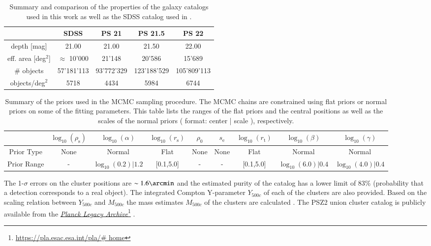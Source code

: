 \documentclass[iop, apjl, twocolappendix, numberedappendix]{emulateapj}
\newcommand\fnurl[2]{%
  \href{#2}{#1}\footnote{\url{#2}}%
}
\begin{document}
\begin{table}
    \centering
    \caption{Summary and comparison of the properties of the galaxy catalogs used in this work as well as the SDSS catalog used in \citet{more2016detection}.}
    \label{tab:galaxy_catalogs}
    \begin{tabular}{ccccc}
    \hline 
    & SDSS & PS 21 & PS 21.5 & PS 22 \\ 
    \hline 
    depth [mag] & 21.00 & 21.00 & 21.50 & 22.00\\ 
    \hline 
    eff. area [deg$^2$] & $\approx$ 10'000 & 21'148 & 20'586 & 15'689\\ 
    \hline 
    \# objects & 57'181'113 & 93'772'329 & 123'188'529 & 105'809'113 \\
    \hline
    objects/deg$^2$ & 5718 & 4434 & 5984 & 6744\\ 
    \hline
    \end{tabular} 
\end{table}
\begin{table}
    \centering
    \caption{Summary of the priors used in the MCMC sampling
procedure. The MCMC chains are constrained using flat priors or
normal priors on some of the fitting parameters. This table lists
the ranges of the flat priors and the central positions as well as
the scales of the normal priors ( format: center | scale ),
respectively.}
    \label{tab:priors}
    \begin{tabular}{ccccccccc}
    \hline 
    & $\log_{10}(\rho_{\mathrm{s}})$ & $\log_{10}(\alpha)$ & $\log_{10}(r_{\mathrm{s}})$ & $\rho_0$ & $s_{\mathrm{e}}$ & $\log_{10}(r_{\mathrm{t}})$ & $\log_{10}(\beta)$ & $\log_{10}(\gamma)$ \\ 
    \hline 
    Prior Type & None & Normal & Flat & None & None & Flat & Normal & Normal\\ 
    \hline 
    Prior Range & - & $\log_{10}(0.2)| 1.2$ & [0.1,5.0] & - & - & [0.1,5.0] & $\log_{10}(6.0) | 0.4$ & $\log_{10}(4.0) | 0.4$\\
    \hline
    \end{tabular} 
\end{table}

The 1-$\sigma$ errors on the cluster positions are $\sim1.6\arcmin$
and the estimated purity of the catalog has a lower limit of 83\%
(probability that a detection corresponds to a real object). The
integrated Compton Y-parameter $Y_{500c}$ of each of the clusters
are also provided. Based on the scaling relation between $Y_{500c}$
and $M_{500c}$ \citep{ade2014planck} the mass estimates $M_{500c}$
of the clusters are calculated
\citep{adam2016planck,collaboration2016planck}. The PSZ2 union
cluster catalog is publicly available from the \fnurl{\textit{Planck
Legacy Archive}}{https://pla.esac.esa.int/pla/\# home}.
\end{document}
